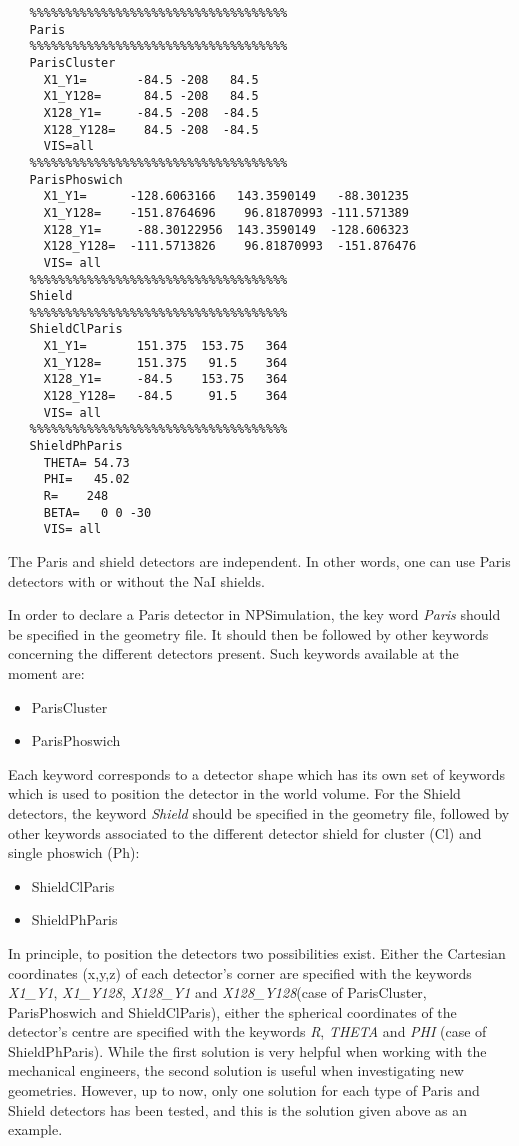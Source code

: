 \documentclass[a4paper,12pt]{article}
\begin{document}
\begin{verbatim}
   %%%%%%%%%%%%%%%%%%%%%%%%%%%%%%%%%%%%
   Paris
   %%%%%%%%%%%%%%%%%%%%%%%%%%%%%%%%%%%%
   ParisCluster
     X1_Y1=       -84.5	-208   84.5
     X1_Y128=      84.5	-208   84.5
     X128_Y1=     -84.5	-208  -84.5
     X128_Y128=    84.5	-208  -84.5
     VIS=all
   %%%%%%%%%%%%%%%%%%%%%%%%%%%%%%%%%%%%
   ParisPhoswich
     X1_Y1=      -128.6063166   143.3590149   -88.301235
     X1_Y128=    -151.8764696    96.81870993 -111.571389
     X128_Y1=     -88.30122956  143.3590149  -128.606323
     X128_Y128=  -111.5713826    96.81870993  -151.876476
     VIS= all
   %%%%%%%%%%%%%%%%%%%%%%%%%%%%%%%%%%%%
   Shield
   %%%%%%%%%%%%%%%%%%%%%%%%%%%%%%%%%%%%
   ShieldClParis
     X1_Y1=       151.375  153.75   364
     X1_Y128=     151.375   91.5    364
     X128_Y1=     -84.5    153.75   364
     X128_Y128=   -84.5     91.5    364
     VIS= all
   %%%%%%%%%%%%%%%%%%%%%%%%%%%%%%%%%%%%
   ShieldPhParis
     THETA= 54.73
     PHI=   45.02
     R=	   248
     BETA=   0 0 -30
     VIS= all
\end{verbatim}

The Paris and shield detectors are independent. In other words, one can use Paris detectors 
with or without the NaI shields. 

In order to declare a Paris detector in NPSimulation, the key
word {\it Paris} should be specified in the geometry file. It
should then be followed by other keywords concerning the different
detectors present. Such keywords available at the moment are:

\begin{itemize}
   \item {ParisCluster}
   \item {ParisPhoswich}
\end{itemize}

Each keyword corresponds to a detector shape which has its own set of keywords which is used 
to position the detector in the world volume.
For the Shield detectors, the keyword {\it Shield} should be specified in the geometry file, 
followed by other keywords associated to the different detector shield for cluster (Cl) and 
single phoswich (Ph):

\begin{itemize}
   \item {ShieldClParis}
   \item {ShieldPhParis}
\end{itemize}

In principle, to position the detectors two possibilities exist. Either the Cartesian 
coordinates (x,y,z) of each detector's corner are specified with the keywords {\it X1\_Y1}, 
{\it X1\_Y128}, {\it X128\_Y1} and {\it X128\_Y128}(case of ParisCluster, ParisPhoswich and 
ShieldClParis), either the spherical coordinates of the detector's centre are specified with 
the keywords {\it R}, {\it THETA} and {\it PHI} (case of ShieldPhParis). While the first 
solution is very helpful when working with the mechanical engineers, the second solution is 
useful when investigating new geometries. However, up to now, only one solution for each 
type of Paris and Shield detectors has been tested, and this is the solution given above as 
an example.
\end{document}
